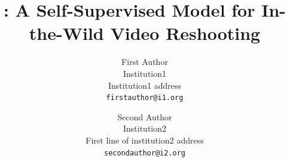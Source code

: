 \documentclass[10pt,twocolumn,letterpaper]{article}
\title{\method{}: A Self-Supervised Model for In-the-Wild Video Reshooting}
\author{First Author\\
Institution1\\
Institution1 address\\
{\tt\small firstauthor@i1.org}
\and
Second Author\\
Institution2\\
First line of institution2 address\\
{\tt\small secondauthor@i2.org}
}
\begin{document}
    


% 




% 


{
    \small
    
    
}

% 
\end{document}
